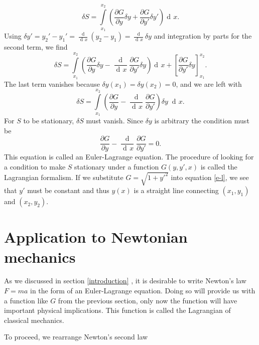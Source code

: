 \documentclass[prb,preprint]{revtex4-1}
\DeclareMathOperator{\dd}{d\!}
\DeclareMathOperator{\ddd}{\mathrm{d}}
\begin{document}
\begin{equation}
\delta S = \int\limits_{x_1}^{x_2} \left(\frac{\partial G}{\partial y} \delta y
+ \frac{\partial G}{\partial y'} \delta y' \right) \dd x.
\end{equation}
Using $\delta y' = y_2' - y_1' = \frac{\ddd }{\dd x}(y_2 - y_1) = \frac{\ddd}{\dd x} \delta y$ and integration by parts for the second term, we find
\begin{equation}
\delta S = \int\limits_{x_1}^{x_2} \left( \frac{\partial G}{\partial y} \delta y
- \frac{\ddd}{\dd x}\frac{\partial G}{\partial y'} \delta y \right) \dd x
+ \left[\frac{\partial G}{\partial y'} \delta y \right]_{x_1}^{x_2}.
\end{equation}
The last term vanishes because $\delta y(x_1) = \delta y(x_2) = 0$, and we are left with
\begin{equation}
\delta S = \int\limits_{x_1}^{x_2} \left( \frac{\partial G}{\partial y}
- \frac{\ddd}{\dd x}\frac{\partial G}{\partial y'} \right) \delta y \; \dd x.
\end{equation}
For $S$ to be stationary, $\delta S$ must vanish. Since $\delta y$ is arbitrary the condition must be
\begin{equation}\label{e-l}
\frac{\partial G}{\partial y} - \frac{\ddd}{\dd x}\frac{\partial G}{\partial y'} = 0.
\end{equation}
This equation is called an Euler-Lagrange equation. The procedure of looking for a condition to make $S$ stationary under a function $G(y,y',x)$ is called the Lagrangian formalism. If we substitute $G = \sqrt{1+y'^2}$ into equation \eqref{e-l}, we see that $y'$ must be constant and thus $y(x)$ is a straight line connecting $(x_1,y_1)$ and $(x_2,y_2)$.



\section{Application to Newtonian mechanics} \label{application}
As we discussed in section \ref{introduction}%
, it is desirable to write Newton's law $F=ma$ in the form of an Euler-Lagrange equation. Doing so will provide us with a function like $G$ from the previous section, only now the function will have important physical implications. This function is called the Lagrangian of classical mechanics.

To proceed, we rearrange Newton's second law
\end{document}
